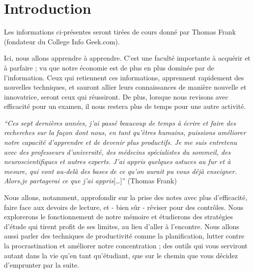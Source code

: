 \hypertarget{introduction}{%
\chapter*{Introduction}\label{introduction}}

Les informations ci-présentes seront tirées de cours donné par Thomas
Frank (fondateur du College Info Geek.com).

Ici, nous allons apprendre à apprendre. C'est une faculté importante à
acquérir et à parfaire ; vu que notre économie est de plus en plus
dominée par de l'information. Ceux qui retiennent ces informations,
apprennent rapidement des nouvelles techniques, et sauront allier leurs
connaissances de manière nouvelle et innovatrice, seront ceux qui
réussiront. De plus, lorsque nous revisons avec efficacité pour un
examen, il nous restera plus de temps pour une autre activité.

\emph{``Ces sept dernières années, j'ai passé beaucoup de temps à écrire
et faire des recherches sur la façon dont nous, en tant qu'êtres
humains, puissions améliorer notre capacité d'apprendre et de devenir
plus productifs. Je me suis entretenu avec des professeurs d'université,
des médecins spécialistes du sommeil, des neuroscientifiques et autres
experts. J'ai appris quelques astuces au fur et à mesure, qui vont
au-delà des bases de ce qu'on aurait pu vous déjà enseigner. Alors,je
partagerai ce que j'ai appris}{[}\ldots{]}'' (Thomas Frank)

Nous allons, notamment, approfondir sur la prise des notes avec plus
d'efficacité, faire face aux devoirs de lecture, et - bien sûr - réviser
pour des contrôles. Nous explorerons le fonctionnement de notre mémoire
et étudierons des stratégies d'étude qui tirent profit de ses limites,
au lieu d'aller à l'encontre. Nous allons aussi parler des techniques de
productivité comme la planification, lutter contre la procrastination et
améliorer notre concentration ; des outils qui vous serviront autant
dans la vie qu'en tant qu'étudiant, que sur le chemin que vous décidez
d'emprunter par la suite.

